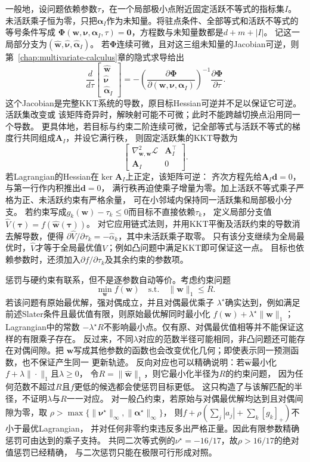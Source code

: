 一般地，设问题依赖参数$\tau$，在一个局部极小点附近固定活跃不等式的指标集$I$。
未活跃乘子恒为零，只把$\bm\alpha_I$作为未知量。将驻点条件、全部等式和活跃不等式的等号条件写成
$\bm\Phi(\bm w,\bm\nu,\bm\alpha_I,\tau)=\bm0$，方程数与未知量数都是$d+m+|I|$。
记这一局部分支为$(\widehat{\bm w},\widehat{\bm\nu},\widehat{\bm\alpha}_I)$。
若$\bm\Phi$连续可微，且对这三组未知量的Jacobian可逆，则第~\ref{chap:multivariate-calculus}章的隐式求导给出
\[
  \frac{d}{d\tau}
  \begin{bmatrix}\widehat{\bm w}\\\widehat{\bm\nu}\\\widehat{\bm\alpha}_I\end{bmatrix}
  =
  -\left(\frac{\partial\bm{\Phi}}
  {\partial(\bm{w},\bm{\nu},\bm{\alpha}_I)}\right)^{-1}
  \frac{\partial\bm{\Phi}}{\partial\tau}.
\]
这个Jacobian是完整KKT系统的导数，原目标Hessian可逆并不足以保证它可逆。活跃集改变或
该矩阵奇异时，解映射可能不可微；此时不能跨越切换点沿用同一个导数。
更具体地，若目标与约束二阶连续可微，记全部等式与活跃不等式的梯度行共同组成$\bm A_I$，并设它满行秩，
则固定活跃集的KKT导数为
\[
 \begin{bmatrix}
 \nabla_{\bm w,\bm w}^2\mathcal L&\bm A_I^\top\\
 \bm A_I&0
 \end{bmatrix}.
\]
若Lagrangian的Hessian在$\ker\bm A_I$上正定，该矩阵可逆：
齐次方程先给$\bm A_I\bm d=0$，与第一行作内积推出$\bm d=0$，
满行秩再迫使乘子增量为零。加上活跃不等式乘子严格为正、未活跃约束有严格余量，
可在小邻域内保持同一活跃集和局部极小分支。
若约束写成$g_k(\bm w)-\tau_k\leq0$而目标不直接依赖$\tau_k$，
定义局部分支值$\widehat V(\bm\tau)=f(\widehat{\bm w}(\bm\tau))$。
对它应用链式法则，并用KKT平衡及活跃约束的导数消去解导数，便得
$\partial\widehat V/\partial\tau_k=-\widehat\alpha_k$，其中未活跃乘子取零。
只有该分支继续为全局最优时，$\widehat V$才等于全局最优值$V$；例如凸问题中满足KKT即可保证这一点。
目标也依赖参数时，还须加入$\partial f/\partial\tau_k$及其余约束的参数项。

惩罚与硬约束有联系，但不是逐参数自动等价。考虑约束问题
\[
  \min_{\bm{w}}f(\bm{w})
  \quad\text{s.t.}\quad
  \lVert\bm{w}\rVert_1\leq R.
\]
若该问题有原始最优解，强对偶成立，并且对偶最优乘子
$\lambda^\star$确实达到，例如满足前述Slater条件且最优值有限，则原始最优解同时最小化
$f(\bm{w})+\lambda^\star\lVert\bm{w}\rVert_1$；Lagrangian中的常数
$-\lambda^\star R$不影响最小点。仅有原、对偶最优值相等并不能保证这样的有限乘子存在。
反过来，不同$\lambda$对应的范数半径可能相同，非凸问题还可能存在对偶间隙。把
$\bm{w}$写成其他参数的函数也会改变优化几何；即使表示同一预测函数，也不保证产生同一
更新轨迹。
反向对应也可以精确说明：若$\widehat{\bm w}$最小化$f+\lambda\|\cdot\|_1$且$\lambda\geq0$，
令$R=\|\widehat{\bm w}\|_1$，则它最小化半径为$R$的约束问题，
因为任何范数不超过$R$且$f$更低的候选都会使惩罚目标更低。
这只构造了与该解匹配的半径，不证明$\lambda$与$R$一一对应。
对一般凸约束，若原始与对偶最优解均达到且对偶间隙为零，取
$\rho>\max\{\|\bm\nu^\star\|_\infty,\|\bm\alpha^\star\|_\infty\}$，
则$f+\rho(\sum_j|a_j|+\sum_k[g_k]_+)$不小于最优Lagrangian，
并对任何非零约束违反多出严格正量。因此有限参数精确惩罚可由达到的乘子支持。
共同二次等式例的$\nu^\star=-16/17$，故$\rho>16/17$的绝对值惩罚已经精确，
与二次惩罚只能在极限可行形成对照。

